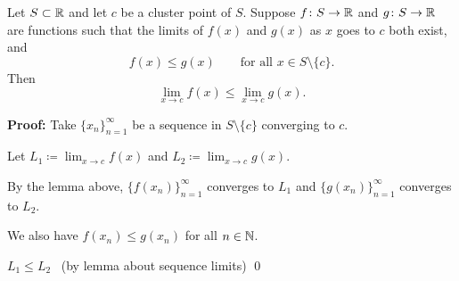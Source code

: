 \documentclass[10pt,aspectratio=169]{beamer}
\begin{document}
\begin{frame}

\begin{corollary}
Let $S \subset {\mathbb{R}}$ and let $c$ be a cluster point of $S$.  
Suppose $f \colon S \to
{\mathbb{R}}$ and $g \colon S \to {\mathbb{R}}$ are functions
such that
the limits of $f(x)$ and $g(x)$ as $x$ goes to $c$ both exist,
and
\begin{equation*}
f(x) \leq g(x) \qquad \text{for all } x \in S \setminus \{ c \}.
\end{equation*}
\pause
Then
\begin{equation*}
\lim_{x\to c} f(x) \leq \lim_{x\to c} g(x) .
\end{equation*}
\end{corollary}

\pause
\textbf{Proof:}
Take $\{ x_n \}_{n=1}^\infty$ be a sequence in $S \setminus \{ c \}$
converging to $c$.

\pause
\medskip

Let \quad
$\displaystyle L_1 \coloneqq \lim_{x\to c} f(x)$
\quad and \quad
$\displaystyle L_2 \coloneqq \lim_{x\to c} g(x)$.

\pause
\medskip

By the lemma above,
$\{ f(x_n) \}_{n=1}^\infty$ converges to $L_1$ and
$\{ g(x_n) \}_{n=1}^\infty$ converges to $L_2$.

\pause
\medskip

We also have $f(x_n) \leq g(x_n)$ for all $n \in {\mathbb{N}}$.

\pause
\medskip

\thus \quad $L_1 \leq L_2$ ~(by lemma about sequence limits)
\qed
\end{frame}
\end{document}
